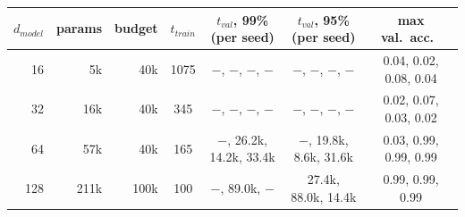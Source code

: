 \begin{tabular}{rrrcccc}
\toprule
$d_{model}$ & params & budget & $t_{train}$ & $t_{val}$, 99\% (per seed) & $t_{val}$, 95\% (per seed) & max val.\ acc.\ \\
\midrule
16 & 5k & 40k & 1075 & $-$, $-$, $-$, $-$ & $-$, $-$, $-$, $-$ & 0.04, 0.02, 0.08, 0.04 \\
32 & 16k & 40k & 345 & $-$, $-$, $-$, $-$ & $-$, $-$, $-$, $-$ & 0.02, 0.07, 0.03, 0.02 \\
64 & 57k & 40k & 165 & $-$, 26.2k, 14.2k, 33.4k & $-$, 19.8k, 8.6k, 31.6k & 0.03, 0.99, 0.99, 0.99 \\
128 & 211k & 100k & 100 & $-$, 89.0k, $-$ & 27.4k, 88.0k, 14.4k & 0.99, 0.99, 0.99 \\
\bottomrule
\end{tabular}